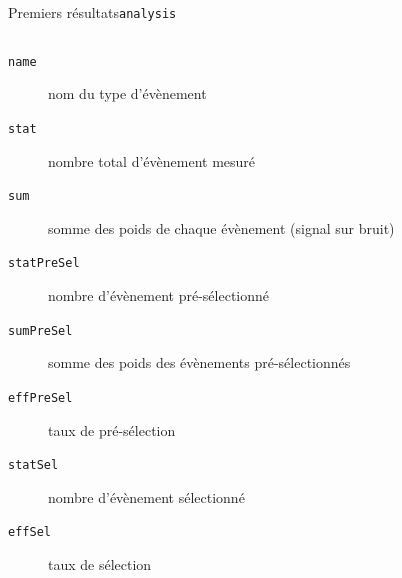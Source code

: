 \documentclass[9pt]{beamer}
\begin{document}
\begin{frame}{Premiers résultats}{\texttt{analysis}}
\begin{columns}
		\begin{column}{0.65\textwidth}
			\begin{description}
				\item[\texttt{name}] nom du type d'évènement
				\item[\texttt{stat}] nombre total d'évènement mesuré
				\item[\texttt{sum}] somme des poids de chaque évènement (signal sur bruit)
				\item[\texttt{statPreSel}] nombre d'évènement pré-sélectionné
				\item[\texttt{sumPreSel}] somme des poids des évènements pré-sélectionnés
				\item[\texttt{effPreSel}] taux de pré-sélection
				
				\item[\texttt{statSel}] nombre d'évènement sélectionné
				\item[\texttt{effSel}] taux de sélection
			\end{description}
        \end{column}
        
        \begin{column}{0.4\textwidth}
			
        \end{column}
        
    \end{columns}

\end{frame}


\end{document}
